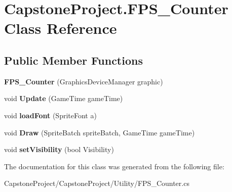 \hypertarget{class_capstone_project_1_1_f_p_s___counter}{\section{Capstone\-Project.\-F\-P\-S\-\_\-\-Counter Class Reference}
\label{d1/db7/class_capstone_project_1_1_f_p_s___counter}
}
\subsection*{Public Member Functions}
\begin{DoxyCompactItemize}
\item 
\hypertarget{class_capstone_project_1_1_f_p_s___counter_aa4b311b83d71702793af770f35665d5a}{{\bfseries F\-P\-S\-\_\-\-Counter} (Graphics\-Device\-Manager graphic)}\label{d1/db7/class_capstone_project_1_1_f_p_s___counter_aa4b311b83d71702793af770f35665d5a}

\item 
\hypertarget{class_capstone_project_1_1_f_p_s___counter_a50971dd7f5656005f2a80707874bc800}{void {\bfseries Update} (Game\-Time game\-Time)}\label{d1/db7/class_capstone_project_1_1_f_p_s___counter_a50971dd7f5656005f2a80707874bc800}

\item 
\hypertarget{class_capstone_project_1_1_f_p_s___counter_af4dcf397acb8bfae9118af5680ef8948}{void {\bfseries load\-Font} (Sprite\-Font a)}\label{d1/db7/class_capstone_project_1_1_f_p_s___counter_af4dcf397acb8bfae9118af5680ef8948}

\item 
\hypertarget{class_capstone_project_1_1_f_p_s___counter_a42a19fb80b83ed33fbaf92db753d837b}{void {\bfseries Draw} (Sprite\-Batch sprite\-Batch, Game\-Time game\-Time)}\label{d1/db7/class_capstone_project_1_1_f_p_s___counter_a42a19fb80b83ed33fbaf92db753d837b}

\item 
\hypertarget{class_capstone_project_1_1_f_p_s___counter_a2efed39113c7db14ed5b9a867b6412bd}{void {\bfseries set\-Visibility} (bool Visibility)}\label{d1/db7/class_capstone_project_1_1_f_p_s___counter_a2efed39113c7db14ed5b9a867b6412bd}

\end{DoxyCompactItemize}


The documentation for this class was generated from the following file\-:\begin{DoxyCompactItemize}
\item 
Capstone\-Project/\-Capstone\-Project/\-Utility/F\-P\-S\-\_\-\-Counter.\-cs\end{DoxyCompactItemize}
